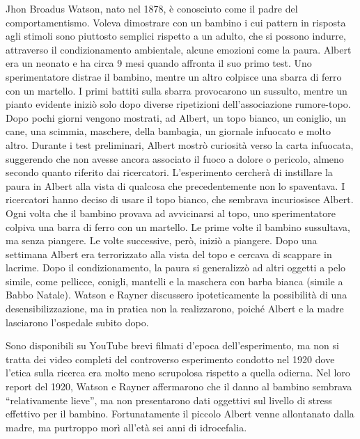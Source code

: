 \documentclass[12pt]{book} %
\begin{document}
\begin{mdframed}[linewidth=1pt]
Jhon Broadus Watson, nato nel 1878, è conosciuto come il padre del comportamentismo. Voleva dimostrare con un bambino i
cui pattern in risposta agli stimoli sono piuttosto semplici rispetto a un adulto, che si possono indurre, attraverso
il condizionamento ambientale, alcune emozioni come la paura. Albert era un neonato e ha circa 9 mesi quando
affronta il suo primo test. Uno sperimentatore distrae il bambino, mentre un altro colpisce una sbarra di ferro con un
martello. I primi battiti sulla sbarra provocarono un sussulto, mentre un pianto evidente iniziò solo dopo diverse ripetizioni dell’associazione rumore-topo. Dopo pochi giorni vengono mostrati, ad Albert, un topo bianco, un coniglio, un cane, una scimmia,
maschere, della bambagia, un giornale infuocato e molto altro. Durante i test preliminari, Albert mostrò curiosità verso la carta infuocata, suggerendo che non avesse ancora associato il fuoco a dolore o pericolo, almeno secondo quanto riferito dai ricercatori. L'esperimento
cercherà di instillare la paura in Albert alla vista di qualcosa che precedentemente non lo spaventava. I ricercatori
hanno deciso di usare il topo bianco, che sembrava incuriosisce Albert. Ogni volta che il bambino provava ad
avvicinarsi al topo, uno sperimentatore colpiva una barra di ferro con un martello. Le prime volte il bambino
sussultava, ma senza piangere. Le volte successive, però, iniziò a piangere. Dopo una settimana Albert era terrorizzato
alla vista del topo e cercava di scappare in lacrime. Dopo il condizionamento, la paura si generalizzò ad altri oggetti a pelo simile, come pellicce, conigli, mantelli e la maschera con barba bianca (simile a Babbo Natale). Watson e Rayner discussero ipoteticamente la possibilità di una desensibilizzazione, ma in pratica non la realizzarono, poiché Albert e la madre lasciarono l’ospedale subito dopo. 

Sono disponibili su YouTube brevi filmati d’epoca dell’esperimento, ma non si tratta dei video completi del controverso esperimento condotto nel 1920 dove l'etica sulla ricerca era molto meno scrupolosa rispetto a quella odierna. 
Nel loro report del 1920, Watson e Rayner affermarono che il danno al bambino sembrava “relativamente lieve”, ma non presentarono dati oggettivi sul livello di stress effettivo per il bambino. Fortunatamente il piccolo Albert
venne allontanato dalla madre, ma purtroppo morì all'età sei anni di
idrocefalia.
\end{mdframed}
\end{document}
